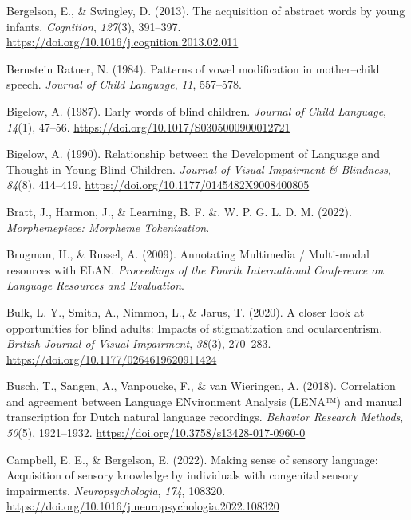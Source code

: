 \documentclass[
  man,floatsintext]{apa6}
\newlength{\cslhangindent}
\newlength{\cslentryspacingunit} %
\newenvironment{CSLReferences}[2] %
 {%
  \setlength{\parindent}{0pt}
  \ifodd #1
  \let\oldpar\par
  \def\par{\hangindent=\cslhangindent\oldpar}
  \fi
  \setlength{\parskip}{#2\cslentryspacingunit}
 }%
 {}
\begin{document}
\begin{CSLReferences}{1}{0}
\leavevmode{}%
Bergelson, E., \& Swingley, D. (2013). The acquisition of abstract words by young infants. \emph{Cognition}, \emph{127}(3), 391--397. \url{https://doi.org/10.1016/j.cognition.2013.02.011}

\leavevmode{}%
Bernstein Ratner, N. (1984). Patterns of vowel modification in mother--child speech. \emph{Journal of Child Language}, \emph{11}, 557--578.

\leavevmode{}%
Bigelow, A. (1987). Early words of blind children. \emph{Journal of Child Language}, \emph{14}(1), 47--56. \url{https://doi.org/10.1017/S0305000900012721}

\leavevmode{}%
Bigelow, A. (1990). Relationship between the {Development} of {Language} and {Thought} in {Young Blind Children}. \emph{Journal of Visual Impairment \& Blindness}, \emph{84}(8), 414--419. \url{https://doi.org/10.1177/0145482X9008400805}

\leavevmode{}%
Bratt, J., Harmon, J., \& Learning, B. F. \&. W. P. G. L. D. M. (2022). \emph{Morphemepiece: {Morpheme Tokenization}}.

\leavevmode{}%
Brugman, H., \& Russel, A. (2009). Annotating {Multimedia} / {Multi-modal} resources with {ELAN}. \emph{Proceedings of the Fourth International Conference on Language Resources and Evaluation}.

\leavevmode{}%
Bulk, L. Y., Smith, A., Nimmon, L., \& Jarus, T. (2020). A closer look at opportunities for blind adults: {Impacts} of stigmatization and ocularcentrism. \emph{British Journal of Visual Impairment}, \emph{38}(3), 270--283. \url{https://doi.org/10.1177/0264619620911424}

\leavevmode{}%
Busch, T., Sangen, A., Vanpoucke, F., \& van Wieringen, A. (2018). Correlation and agreement between {Language ENvironment Analysis} ({LENA}™) and manual transcription for {Dutch} natural language recordings. \emph{Behavior Research Methods}, \emph{50}(5), 1921--1932. \url{https://doi.org/10.3758/s13428-017-0960-0}

\leavevmode{}%
Campbell, E. E., \& Bergelson, E. (2022). Making sense of sensory language: {Acquisition} of sensory knowledge by individuals with congenital sensory impairments. \emph{Neuropsychologia}, \emph{174}, 108320. \url{https://doi.org/10.1016/j.neuropsychologia.2022.108320}


\end{CSLReferences}
\end{document}
